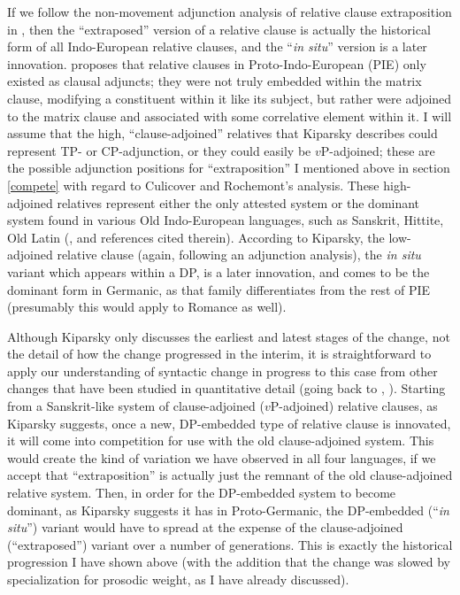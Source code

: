 If we follow the non-movement adjunction analysis of relative clause extraposition in \citet{culicoverrochemont1990}, then the ``extraposed'' version of a relative clause is actually the historical form of all Indo-European relative clauses, and the ``\textsl{in situ}'' version is a later innovation. \citet{kiparsky1995} proposes that relative clauses in Proto-Indo-European (PIE) only existed as clausal adjuncts; they were not truly embedded within the matrix clause, modifying a constituent within it like its subject, but rather were adjoined to the matrix clause and associated with some correlative element within it. I will assume that the high, ``clause-adjoined'' relatives that Kiparsky describes could represent TP- or CP-adjunction, or they could easily be $v$P-adjoined; these are the possible adjunction positions for ``extraposition'' I mentioned above in section \ref{compete} with regard to Culicover and Rochemont's analysis.   These high-adjoined relatives represent either the only attested system or the dominant system found in various Old Indo-European languages, such as Sanskrit, Hittite, Old Latin (\citealt[][155]{kiparsky1995}, and references cited therein). According to Kiparsky, the low-adjoined relative clause (again, following an adjunction analysis), the \textsl{in situ} variant which appears within a DP, is a later innovation, and comes to be the dominant form in Germanic, as that family differentiates from the rest of PIE (presumably this would apply to Romance as well).

Although Kiparsky only discusses the earliest and latest stages of the change, not the detail of how the change progressed in the interim, it is straightforward to apply our understanding of syntactic change in progress to this case from other changes that have been studied in quantitative detail (going back to \citealt{kroch1989}, \citealt{santorini1989}). Starting from a Sanskrit-like system of clause-adjoined ($v$P-adjoined) relative clauses, as Kiparsky suggests, once a new, DP-embedded type of relative clause is innovated, it will come into competition for use with the old clause-adjoined system. This would create the kind of variation we have observed in all four languages, if we accept that ``extraposition'' is actually just the remnant of the old clause-adjoined relative system. Then, in order for the DP-embedded system to become dominant, as Kiparsky suggests it has in Proto-Germanic, the DP-embedded (``\textsl{in situ}'') variant would have to spread at the expense of the clause-adjoined (``extraposed'') variant over a number of generations. This is exactly the historical progression I have shown above (with the addition that the change was slowed by specialization for prosodic weight, as I have already discussed).

